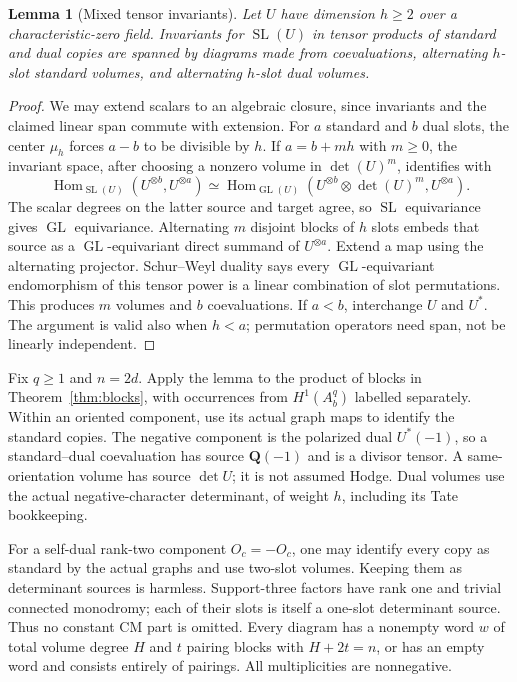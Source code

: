 \documentclass[11pt]{article}
\newtheorem{lemma}[theorem]{Lemma}
\theoremstyle{definition}
\newcommand{\Q}{\mathbf Q}
\newcommand{\SL}{\operatorname{SL}}
\newcommand{\GL}{\operatorname{GL}}
\newcommand{\Hom}{\operatorname{Hom}}
\begin{document}
\begin{lemma}[Mixed tensor invariants]\label{lem:fft}
Let $U$ have dimension $h\geq2$ over a characteristic-zero field.
Invariants for $\SL(U)$ in tensor products of standard and dual copies
are spanned by diagrams made from coevaluations, alternating $h$-slot
standard volumes, and alternating $h$-slot dual volumes.
\end{lemma}
\begin{proof}
We may extend scalars to an algebraic closure, since invariants and the
claimed linear span commute with extension. For $a$ standard and $b$ dual
slots, the center $\mu_h$ forces
$a-b$ to be divisible by $h$. If $a=b+mh$ with $m\geq0$, the invariant
space, after choosing a nonzero volume in $\det(U)^m$, identifies with
\[
 \Hom_{\SL(U)}(U^{\otimes b},U^{\otimes a})
 \simeq\Hom_{\GL(U)}(U^{\otimes b}\otimes\det(U)^m,U^{\otimes a}).
\]
The scalar degrees on the latter source and target agree, so $\SL$
equivariance gives $\GL$ equivariance. Alternating $m$ disjoint blocks
of $h$ slots embeds that source as a $\GL$-equivariant direct summand
of $U^{\otimes a}$. Extend a map using the alternating projector.
Schur--Weyl duality \cite[Theorem~4.57(i), Proposition~4.58]{Etingof} says
every $\GL$-equivariant endomorphism of this tensor power is a linear
combination of slot permutations. This produces
$m$ volumes and $b$ coevaluations. If $a<b$, interchange $U$ and $U^*$.
The argument is valid also when $h<a$; permutation operators need span,
not be linearly independent.
\end{proof}

Fix $q\geq1$ and $n=2d$. Apply the lemma to the product of blocks in
Theorem~\ref{thm:blocks}, with occurrences from $H^1(A_b^q)$ labelled
separately. Within an oriented component, use its actual graph maps to
identify the standard copies. The negative component is the polarized dual
$U^*(-1)$, so a standard--dual coevaluation has source $\Q(-1)$ and
is a divisor tensor. A same-orientation volume has source $\det U$;
it is not assumed Hodge. Dual volumes use the actual negative-character
determinant, of weight $h$, including its Tate bookkeeping.

For a self-dual rank-two component $O_c=-O_c$, one may identify every
copy as standard by the actual graphs and use two-slot volumes. Keeping
them as determinant sources is harmless. Support-three factors have rank
one and trivial connected monodromy; each of their slots is itself a
one-slot determinant source. Thus no constant CM part is omitted.
Every diagram has a nonempty word $w$ of total volume degree $H$ and
$t$ pairing blocks with $H+2t=n$, or has an empty word and consists
entirely of pairings. All multiplicities are nonnegative.
\end{document}
